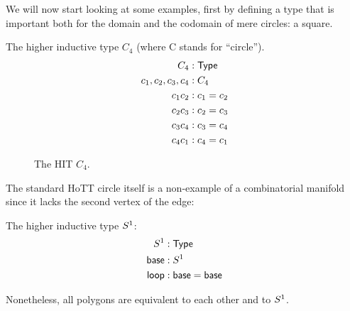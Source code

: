 We will now start looking at some examples, first by defining a type that is important both for the domain and the codomain of mere circles: a square.

\begin{mydef}
The higher inductive type \( C_4 \) (where C stands for ``circle'').
\begin{align*}
C_4 &: \mathsf{Type} \\
c_1, c_2, c_3, c_4 &: C_4 \\
c_1c_2 &: c_1 = c_2 \\
c_2c_3 &: c_2 = c_3 \\
c_3c_4 &: c_3 = c_4 \\
c_4c_1 &: c_4 = c_1 \\
\end{align*}
\end{mydef}

\begin{figure}[htbp]
\centering

\caption{The HIT \( C_4 \).}
\end{figure}

The standard HoTT circle itself is a non-example of a combinatorial manifold since it lacks the second vertex of the edge:

\begin{mydef}
The higher inductive type \( S^1 \):
\begin{align*}
S^1 &:\mathsf{Type} \\
\mathsf{base}&:S^1 \\
\mathsf{loop}&:\mathsf{base}=\mathsf{base}
\end{align*}
\end{mydef}

Nonetheless, all polygons are equivalent to each other and to \( S^1 \).

